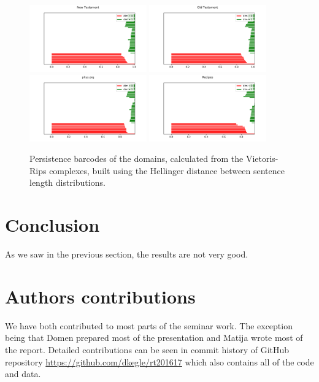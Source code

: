 \documentclass[12pt,a4paper]{amsart}
\begin{document}
\begin{figure}
  \centering
  \includegraphics[width=0.45\textwidth]{../plots/barcodes/bible-new-hell}
  \includegraphics[width=0.45\textwidth]{../plots/barcodes/bible-old-hell}
  \includegraphics[width=0.45\textwidth]{../plots/barcodes/phys-hell}
  \includegraphics[width=0.45\textwidth]{../plots/barcodes/recipes-hell}
  \caption{Persistence barcodes of the domains, calculated from the
    Vietoris-Rips complexes, built using the Hellinger distance between sentence
    length distributions.}
  \label{fig:barcode:hell}
\end{figure}

\section{Conclusion}

As we saw in the previous section, the results are not very good.



\section{Authors contributions}
We have both contributed to most parts of the seminar work. The exception being that Domen prepared most of the presentation and Matija wrote most of the report. Detailed contributions can be seen in commit history of GitHub repository \url{https://github.com/dkegle/rt201617} which also contains all of the code and data.



\end{document}
